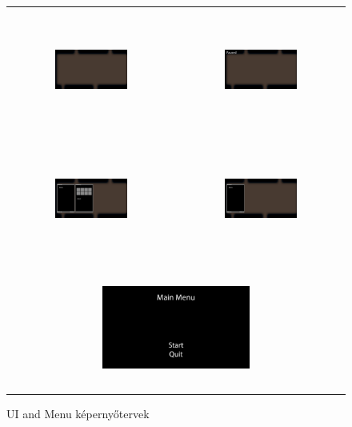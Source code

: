 \begin{figure}[h!]
    \begin{center}
        \begin{tabular}{ cc }
            \includegraphics[width=0.45\textwidth, height=40mm]{images/nonPaused.png}
            & 
            \includegraphics[width=0.45\textwidth, height=40mm]{images/Paused.png}    
            \\
            \includegraphics[width=0.45\textwidth, height=40mm]{images/Inventory.png}
            &
            \includegraphics[width=0.45\textwidth, height=40mm]{images/Statistics.png}
            \\
            \multicolumn{2}{c}{\includegraphics[width=0.45\textwidth, height=40mm]{images/MainMenu.png}}
        \end{tabular}
    \end{center}
    \caption{UI and Menu képernyőtervek}
    \label{tbl:tableofuiandmenu}
\end{figure}

